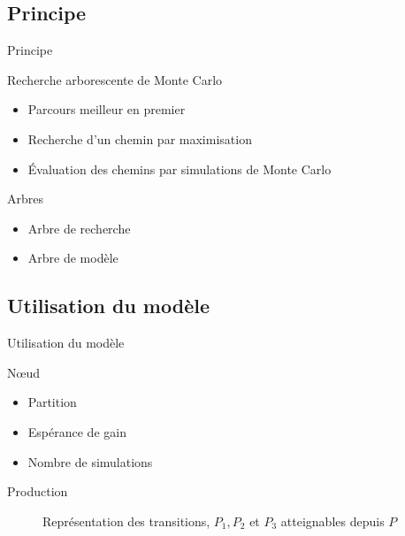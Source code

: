 \documentclass[tikz]{beamer}
\begin{document}
\subsection{Principe}
\begin{frame}[c]{Principe}
  \begin{block}{Recherche arborescente de Monte Carlo}
    \begin{itemize}
      \item Parcours meilleur en premier
      \item Recherche d'un chemin par maximisation
      \item Évaluation des chemins par simulations de Monte Carlo
    \end{itemize}
  \end{block}
  \begin{block}{Arbres}
    \begin{itemize}
      \item Arbre de recherche
      \item Arbre de modèle
    \end{itemize}
  \end{block}
\end{frame}

\subsection{Utilisation du modèle}
\begin{frame}[c]{Utilisation du modèle}
  \begin{block}{N\oe{}ud}
    \begin{itemize}
      \item Partition
      \item Espérance de gain
      \item Nombre de simulations
    \end{itemize}
  \end{block}
  \begin{block}{Production}
    \begin{figure}
    \begin{center}
    \end{center}
    \caption{Représentation des transitions, \(P_1, P_2\) et \(P_3\)
    atteignables depuis \(P\)}
    \end{figure}
  \end{block}
\end{frame}
\end{document}
